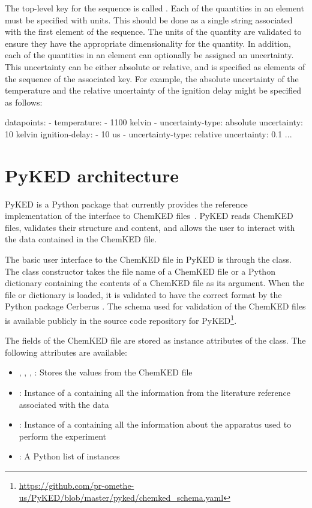 \documentclass[12pt]{ussci}
\newcommand\ck{ChemKED}
\newcommand\pk{PyKED}
\begin{document}
The top-level key for the sequence is called . Each of the
quantities in an element must be specified with units. This should be done as a
single string associated with the first element of the sequence. The units of
the quantity are validated to ensure they have the appropriate dimensionality
for the quantity. In addition, each of the quantities in an element can
optionally be assigned an uncertainty. This uncertainty can be either absolute
or relative, and is specified as elements of the sequence of the associated key.
For example, the absolute uncertainty of the temperature and the relative
uncertainty of the ignition delay might be specified as follows:

\begin{yamlbox}
datapoints:
  - temperature:
      - 1100 kelvin
      - uncertainty-type: absolute
        uncertainty: 10 kelvin
    ignition-delay:
      - 10 us
      - uncertainty-type: relative
        uncertainty: 0.1
    ...
\end{yamlbox}

\section{PyKED architecture}\label{sec:pyked-architecture}
%
\pk{} is a Python package that currently provides the reference implementation
of the interface to \ck{} files~\autocite{PyKED}. \pk{} reads \ck{} files, validates
their structure and content, and allows the user to interact with the data contained
in the \ck{} file.

The basic user interface to the \ck{} file in \pk{} is through the
 class. The  class constructor takes the file name
of a \ck{} file or a Python dictionary containing the contents of a \ck{} file
as its argument. When the file or dictionary is loaded, it is validated to have
the correct format by the Python package Cerberus \autocite{cerberus}. The
schema used for validation of the \ck{} files is available publicly in the
source code repository for
PyKED\footnote{\url{https://github.com/pr-omethe-us/PyKED/blob/master/pyked/chemked_schema.yaml}}.

The fields of the \ck{} file are stored as instance attributes of the
 class. The following attributes are available:
%
\begin{itemize}
    \item {}, , ,
    : Stores the values from the \ck{} file
    \item {}: Instance of a  containing all
    the information from the literature reference associated with the data
    \item {}: Instance of a  containing all
    the information about the apparatus used to perform the experiment
    \item {}: A Python list of  instances
\end{itemize}
\end{document}
